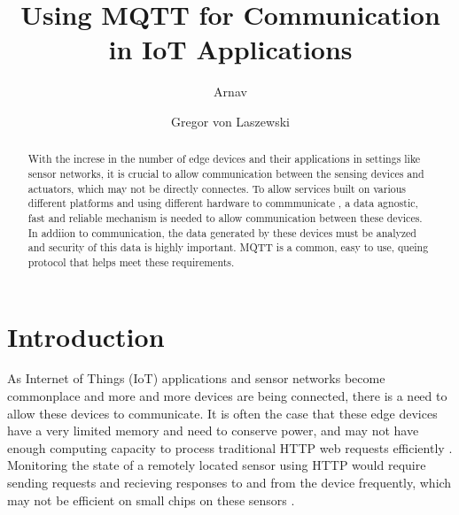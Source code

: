 \documentclass[sigconf]{acmart}
\begin{document}
\title{Using MQTT for Communication in IoT Applications}


\author{Arnav}

\author{Gregor von Laszewski}




\begin{abstract}

  With the increse in the number of edge devices and their
  applications in settings like sensor networks, it is crucial to
  allow communication between the sensing devices and actuators, which
  may not be directly connectes. To allow services built on various
  different platforms and using different hardware to commmunicate , a
  data agnostic, fast and reliable mechanism is needed to allow
  communication between these devices. In addiion to communication,
  the data generated by these devices must be analyzed and security of
  this data is highly important. MQTT is a common, easy to use, queing
  protocol that helps meet these requirements.

\end{abstract}



\maketitle



\section{Introduction}

As Internet of Things (IoT) applications and sensor networks become
commonplace and more and more devices are being connected, there is a
need to allow these devices to communicate. It is often the case that
these edge devices have a very limited memory and need to conserve
power, and may not have enough computing capacity to process
traditional HTTP web requests efficiently
\cite{mqtt-vs-http}\cite{hivemq-website}. Monitoring the state of a
remotely located sensor using HTTP would require sending requests and
recieving responses to and from the device frequently, which may not
be efficient on small chips on these sensors \cite{mqtt-vs-http}.
\end{document}
